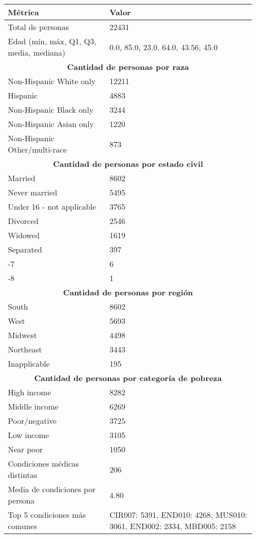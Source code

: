 \documentclass[12pt]{article}
\begin{document}
\begin{longtable}{|l|l|}
\hline
\textbf{Métrica} & \textbf{Valor} \\
\hline
Total de personas & 22431 \\
Edad (mín, máx, Q1, Q3, media, mediana) & 0.0, 85.0, 23.0, 64.0, 43.56, 45.0 \\
\hline
\multicolumn{2}{|c|}{\textbf{Cantidad de personas por raza}} \\
\hline
Non-Hispanic White only & 12211 \\
Hispanic & 4883 \\
Non-Hispanic Black only & 3244 \\
Non-Hispanic Asian only & 1220 \\
Non-Hispanic Other/multi-race & 873 \\
\hline
\multicolumn{2}{|c|}{\textbf{Cantidad de personas por estado civil}} \\
\hline
Married & 8602 \\
Never married & 5495 \\
Under 16 - not applicable & 3765 \\
Divorced & 2546 \\
Widowed & 1619 \\
Separated & 397 \\
-7 & 6 \\
-8 & 1 \\
\hline
\multicolumn{2}{|c|}{\textbf{Cantidad de personas por región}} \\
\hline
South & 8602 \\
West & 5693 \\
Midwest & 4498 \\
Northeast & 3443 \\
Inapplicable & 195 \\
\hline
\multicolumn{2}{|c|}{\textbf{Cantidad de personas por categoría de pobreza}} \\
\hline
High income & 8282 \\
Middle income & 6269 \\
Poor/negative & 3725 \\
Low income & 3105 \\
Near poor & 1050 \\
\hline
Condiciones médicas distintas & 206 \\
Media de condiciones por persona & 4.80 \\
Top 5 condiciones más comunes & CIR007: 5391, END010: 4268, MUS010: 3061, END002: 2334, MBD005: 2158 \\
\hline
\end{longtable}
\end{document}
